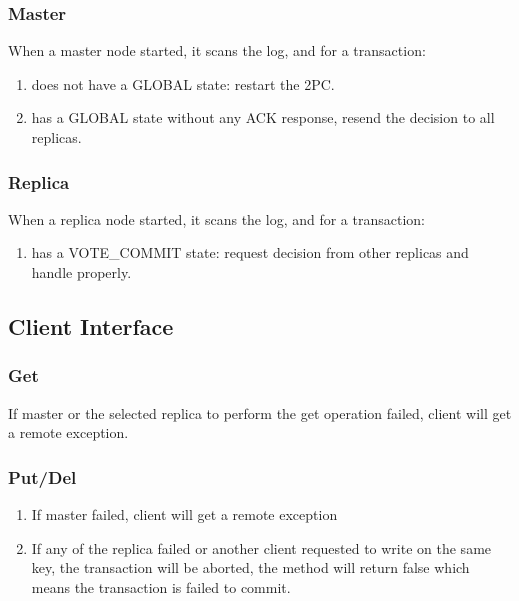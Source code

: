 \documentclass[11pt, oneside]{article}   	%
\begin{document}
\subsubsection{Master}
When a master node started, it scans the log, and for a transaction:
\begin{enumerate}
\item does not have a GLOBAL state: restart the 2PC.
\item has a GLOBAL state without any ACK response, resend the decision to all replicas.
\end{enumerate}
\subsubsection{Replica}
When a replica node started, it scans the log, and for a transaction:
\begin{enumerate}
\item has a VOTE\_COMMIT state: request decision from other replicas and handle properly.
\end{enumerate}

\subsection{Client Interface}
\subsubsection{Get}
If master or the selected replica to perform the get operation failed, client will get a remote exception.
\subsubsection{Put/Del}
\begin{enumerate}
\item If master failed, client will get a remote exception
\item If any of the replica failed or another client requested to write on the same key, the transaction will be aborted, the method will return false which means the transaction is failed to commit.
\end{enumerate}
\end{document}
